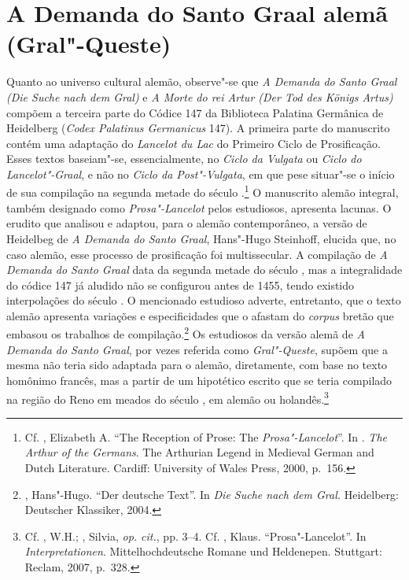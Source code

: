 \section*{A Demanda do Santo Graal alemã (Gral"-Queste)}

Quanto ao universo cultural alemão, observe"-se que  \textit{A Demanda do Santo
Graal} \textit{(Die Suche nach dem Gral) }e \textit{A Morte do rei Artur (Der
Tod des Königs Artus)} compõem a terceira parte do Códice 147 da Biblioteca
Palatina Germânica de Heidelberg (\textit{Codex Palatinus Germanicus} 147). A
primeira parte do manuscrito contém uma adaptação do \textit{Lancelot du Lac} do
Primeiro Ciclo de Prosificação. Esses textos baseiam"-se, essencialmente, no
\textit{Ciclo da Vulgata} ou \textit{Ciclo do Lancelot"-Graal}, e não no
\textit{Ciclo da Post"-Vulgata}, em que pese situar"-se o início de sua compilação
na segunda metade do século .\footnote{ Cf. , Elizabeth A.
“The Reception of Prose: The \textit{Prosa"-Lancelot}”. In . \textit{The
Arthur of the Germans}. The Arthurian Legend in Medieval German and Dutch
Literature. Cardiff: University of Wales Press, 2000, p.~156. } O manuscrito
alemão integral, também designado como \textit{Prosa"-Lancelot} pelos estudiosos,
apresenta lacunas. O erudito que analisou e adaptou, para o alemão
contemporâneo, a versão de Heidelbeg de\textit{ A Demanda do Santo Graal},
Hans"-Hugo Steinhoff, elucida que, no caso alemão, esse processo de prosificação
foi multissecular. A compilação de \textit{A Demanda do Santo Graal} data da
segunda metade do século , mas a integralidade do códice 147 já aludido não
se configurou antes de 1455, tendo existido interpolações do século
. O mencionado estudioso adverte, entretanto, que o texto alemão
apresenta variações e especificidades que o afastam do \textit{corpus} bretão
que embasou os trabalhos de compilação.\footnote{ , Hans"-Hugo. “Der
deutsche Text”.  In \textit{Die Suche nach dem Gral. }Heidelberg: Deutscher
Klassiker, 2004.  } Os estudiosos da versão alemã de \textit{A Demanda
do Santo Graal}, por vezes referida como \textit{Gral"-Queste}, supõem que a
mesma não teria sido adaptada para o alemão, diretamente, com base no texto
homônimo francês, mas a partir de um hipotético escrito que se teria compilado
na região do Reno em meados do século , em alemão ou
holandês.\footnote{ Cf. , W.H.;  , Silvia, \textit{op. cit.}, pp.
3--4. Cf. , Klaus.  “Prosa"-Lancelot”. In
\textit{Interpretationen}. Mittelhochdeutsche Romane und Heldenepen. Stuttgart:
Reclam, 2007, p.~328. }

